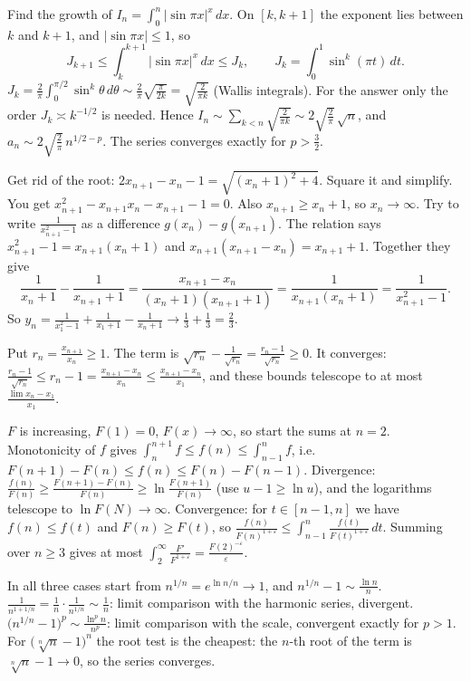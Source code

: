 \documentclass[11pt,a4paper]{article}
\begin{document}
 Find the growth of \(I_n=\int_0^n|\sin\pi x|^x\,dx\). On \([k,k+1]\) the exponent lies between \(k\) and \(k+1\), and \(|\sin\pi x|\le1\), so
\[J_{k+1}\le\int_k^{k+1}|\sin\pi x|^x\,dx\le J_k,\qquad J_k=\int_0^1\sin^k(\pi t)\,dt.\]
 \(J_k=\frac2\pi\int_0^{\pi/2}\sin^k\theta\,d\theta\sim\frac2\pi\sqrt{\frac\pi{2k}}=\sqrt{\frac2{\pi k}}\) (Wallis integrals). For the answer only the order \(J_k\asymp k^{-1/2}\) is needed.
 Hence \(I_n\sim\sum_{k\lt n}\sqrt{\frac2{\pi k}}\sim2\sqrt{\frac2\pi}\,\sqrt n\), and \(a_n\sim2\sqrt{\frac2\pi}\,n^{1/2-p}\). The series converges exactly for \(p\gt\frac32\).

 Get rid of the root: \(2x_{n+1}-x_n-1=\sqrt{(x_n+1)^2+4}\). Square it and simplify.
 You get \(x_{n+1}^2-x_{n+1}x_n-x_{n+1}-1=0\). Also \(x_{n+1}\ge x_n+1\), so \(x_n\to\infty\). Try to write \(\frac1{x_{n+1}^2-1}\) as a difference \(g(x_n)-g(x_{n+1})\).
 The relation says \(x_{n+1}^2-1=x_{n+1}(x_n+1)\) and \(x_{n+1}(x_{n+1}-x_n)=x_{n+1}+1\). Together they give
\[\frac1{x_n+1}-\frac1{x_{n+1}+1}=\frac{x_{n+1}-x_n}{(x_n+1)(x_{n+1}+1)}=\frac1{x_{n+1}(x_n+1)}=\frac1{x_{n+1}^2-1}.\]
 So \(y_n=\frac1{x_1^2-1}+\frac1{x_1+1}-\frac1{x_n+1}\to\frac13+\frac13=\frac23\).

 Put \(r_n=\frac{x_{n+1}}{x_n}\ge1\). The term is \(\sqrt{r_n}-\frac1{\sqrt{r_n}}=\frac{r_n-1}{\sqrt{r_n}}\ge0\).
 It converges: \(\frac{r_n-1}{\sqrt{r_n}}\le r_n-1=\frac{x_{n+1}-x_n}{x_n}\le\frac{x_{n+1}-x_n}{x_1}\), and these bounds telescope to at most \(\frac{\lim x_n-x_1}{x_1}\).

 \(F\) is increasing, \(F(1)=0\), \(F(x)\to\infty\), so start the sums at \(n=2\). Monotonicity of \(f\) gives \(\int_n^{n+1}f\le f(n)\le\int_{n-1}^nf\), i.e.\ \(F(n+1)-F(n)\le f(n)\le F(n)-F(n-1)\).
 Divergence: \(\frac{f(n)}{F(n)}\ge\frac{F(n+1)-F(n)}{F(n)}\ge\ln\frac{F(n+1)}{F(n)}\) (use \(u-1\ge\ln u\)), and the logarithms telescope to \(\ln F(N)\to\infty\).
 Convergence: for \(t\in[n-1,n]\) we have \(f(n)\le f(t)\) and \(F(n)\ge F(t)\), so \(\frac{f(n)}{F(n)^{1+\varepsilon}}\le\int_{n-1}^n\frac{f(t)}{F(t)^{1+\varepsilon}}\,dt\). Summing over \(n\ge3\) gives at most \(\int_2^\infty\frac{F'}{F^{1+\varepsilon}}=\frac{F(2)^{-\varepsilon}}\varepsilon\).

 In all three cases start from \(n^{1/n}=e^{\ln n/n}\to1\), and \(n^{1/n}-1\sim\frac{\ln n}n\).
 \(\frac1{n^{1+1/n}}=\frac1n\cdot\frac1{n^{1/n}}\sim\frac1n\): limit comparison with the harmonic series, divergent. \(\bigl(n^{1/n}-1\bigr)^p\sim\frac{\ln^pn}{n^p}\): limit comparison with the scale, convergent exactly for \(p\gt1\).
 For \(\bigl(\sqrt[n]n-1\bigr)^n\) the root test is the cheapest: the \(n\)-th root of the term is \(\sqrt[n]n-1\to0\), so the series converges.
\end{document}
